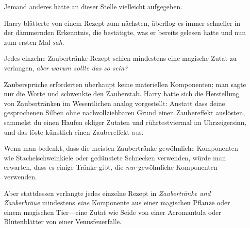 Jemand anderes hätte an dieser Stelle vielleicht aufgegeben.

Harry blätterte von einem Rezept zum nächsten, überflog es immer schneller in der dämmernden Erkenntnis, die bestätigte, was er bereits gelesen hatte und nun zum ersten Mal \emph{sah}.

Jedes einzelne Zaubertränke-Rezept schien mindestens eine magische Zutat zu verlangen, \emph{aber warum sollte das so sein?}

Zaubersprüche erforderten überhaupt keine materiellen Komponenten; man sagte nur die Worte und schwenkte den Zauberstab. Harry hatte sich die Herstellung von Zaubertränken im Wesentlichen analog vorgestellt: Anstatt dass deine gesprochenen Silben ohne nachvollziehbaren Grund einen Zaubereffekt auslösten, sammelst du einen Haufen ekliger Zutaten und rührtestviermal im Uhrzeigersinn, und das löste künstlich einen Zaubereffekt aus.

Wenn man bedenkt, dass die meisten Zaubertränke gewöhnliche Komponenten wie Stachelschweinkiele oder gedünstete Schnecken verwenden, würde man erwarten, dass es einige Tränke gibt, die \emph{nur} gewöhnliche Komponenten verwenden.

Aber stattdessen verlangte jedes einzelne Rezept in \emph{Zaubertränke und Zauberbräue} mindestens \emph{eine} Komponente aus einer magischen Pflanze oder einem magischen Tier—eine Zutat wie Seide von einer Acromantula oder Blütenblätter von einer Venusfeuerfalle.

